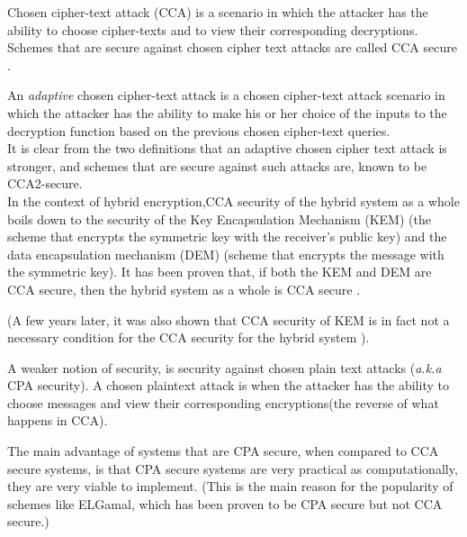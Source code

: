 Chosen cipher-text attack (CCA) is a scenario in which the attacker has the ability to choose cipher-texts and to view their corresponding decryptions.
Schemes that are secure against chosen cipher text attacks are called CCA secure \cite{springer_cca}.

An \emph{adaptive} chosen cipher-text attack is a chosen cipher-text attack scenario in which the attacker has the ability to make his or her choice of the inputs to the decryption function based on the previous chosen cipher-text queries.\\

It is clear from the two definitions that an adaptive chosen cipher text attack is stronger, and schemes that are secure against such attacks are, known to be CCA2-secure.\\

In the context of hybrid encryption,CCA security of the hybrid system as a whole boils down to the security of the Key Encapsulation Mechanism (KEM) (the scheme that encrypts the symmetric key with the receiver's public key) and the data encapsulation mechanism (DEM) (scheme that encrypts the message with the symmetric key).
It has been proven that, if both the KEM and DEM are CCA secure, then the hybrid system as a whole is CCA secure \cite{cryptoeprint:2001:108}.

(A few years later, it was also shown that CCA security of KEM is in fact not a necessary condition for the CCA security for the hybrid system \cite{kuro_des}).

A weaker notion of security, is security against chosen plain text attacks (\emph{a.k.a} CPA security).
A chosen plaintext attack is when the attacker has the ability to choose messages and view their corresponding encryptions(the reverse of what happens in CCA).

The main advantage of systems that are CPA secure, when compared to CCA secure systems, is that CPA secure systems are very practical as computationally, they are very viable to implement.
(This is the main reason for the popularity of schemes like ELGamal, which has been proven to be CPA secure but not CCA secure.)
